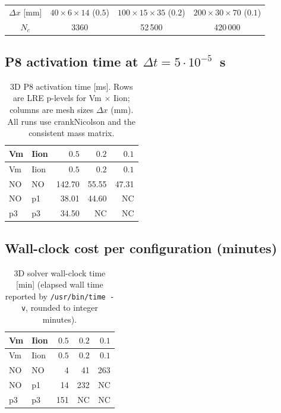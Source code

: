 \documentclass[11pt,a4paper]{article}
\begin{document}
\begin{center}\small
\begin{tabular}{cccc}\toprule
$\Delta x$ [mm] & $40\!\times\!6\!\times\!14$ ($0.5$) &
                 $100\!\times\!15\!\times\!35$ ($0.2$) &
                 $200\!\times\!30\!\times\!70$ ($0.1$) \\
$N_{c}$ & 3360 & 52\,500 & 420\,000 \\
\bottomrule\end{tabular}\end{center}

\subsection{P8 activation time at $\Delta t = 5\!\cdot\!10^{-5}$~s}

\begin{center}\footnotesize
\begin{longtable}{llrrr}
\caption{3D P8 activation time [ms]. Rows are LRE p-levels for
Vm $\times$ Iion; columns are mesh sizes $\Delta x$ (mm). All runs use
crankNicolson and the consistent mass matrix.}\\
\toprule
Vm & Iion & $0.5$ & $0.2$ & $0.1$ \\
\midrule\endfirsthead\toprule
Vm & Iion & $0.5$ & $0.2$ & $0.1$ \\
\midrule\endhead
NO & NO & 142.70 & 55.55 & 47.31 \\
NO & p1 &  38.01 & 44.60 & NC    \\
p3 & p3 &  34.50 & NC    & NC    \\
\bottomrule\end{longtable}\end{center}

\subsection{Wall-clock cost per configuration (minutes)}

\begin{center}\footnotesize
\begin{longtable}{llrrr}
\caption{3D solver wall-clock time [min] (elapsed wall time reported
by \texttt{/usr/bin/time -v}, rounded to integer minutes).}\\
\toprule
Vm & Iion & $0.5$ & $0.2$ & $0.1$ \\
\midrule\endfirsthead\toprule
Vm & Iion & $0.5$ & $0.2$ & $0.1$ \\
\midrule\endhead
NO & NO &   4 &  41 & 263 \\
NO & p1 &  14 & 232 & NC  \\
p3 & p3 & 151 & NC  & NC  \\
\bottomrule\end{longtable}\end{center}
\end{document}
